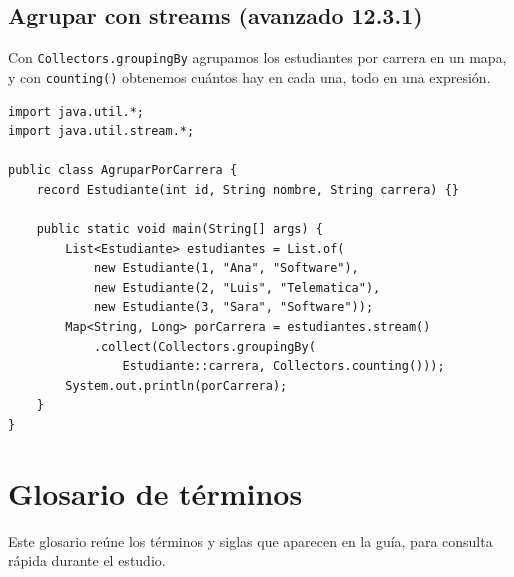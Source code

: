 \documentclass[11pt]{article}
\begin{document}
\subsection{Agrupar con streams (avanzado 12.3.1)}
Con \texttt{Collectors.\allowbreak{}grouping\allowbreak{}By} agrupamos los estudiantes por carrera en un mapa, y con \texttt{counting()} obtenemos cuántos hay en cada una, todo en una expresión.

\begin{cajacodigo}
\begin{lstlisting}[style=java]
import java.util.*;
import java.util.stream.*;

public class AgruparPorCarrera {
    record Estudiante(int id, String nombre, String carrera) {}

    public static void main(String[] args) {
        List<Estudiante> estudiantes = List.of(
            new Estudiante(1, "Ana", "Software"),
            new Estudiante(2, "Luis", "Telematica"),
            new Estudiante(3, "Sara", "Software"));
        Map<String, Long> porCarrera = estudiantes.stream()
            .collect(Collectors.groupingBy(
                Estudiante::carrera, Collectors.counting()));
        System.out.println(porCarrera);
    }
}
\end{lstlisting}
\end{cajacodigo}
\vspace{2pt}
\section{Glosario de términos}
Este glosario reúne los términos y siglas que aparecen en la guía, para consulta rápida durante el estudio.
\end{document}
